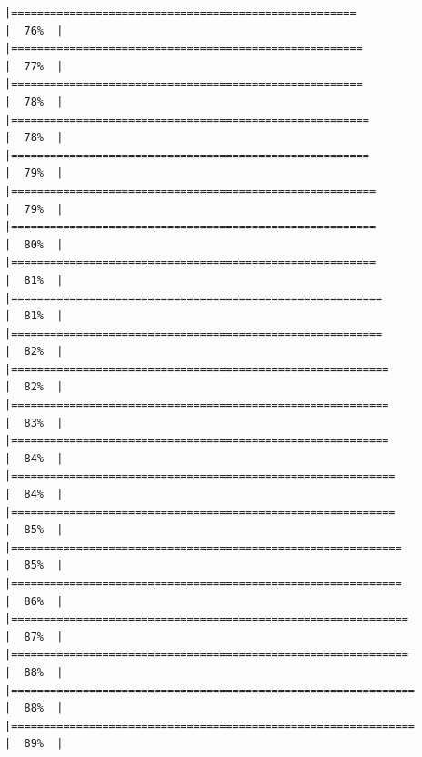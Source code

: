 \documentclass[
]{article}
\begin{document}
\begin{verbatim}
|=====================================================                 |  76%  |                                                                              |======================================================                |  77%  |                                                                              |======================================================                |  78%  |                                                                              |=======================================================               |  78%  |                                                                              |=======================================================               |  79%  |                                                                              |========================================================              |  79%  |                                                                              |========================================================              |  80%  |                                                                              |========================================================              |  81%  |                                                                              |=========================================================             |  81%  |                                                                              |=========================================================             |  82%  |                                                                              |==========================================================            |  82%  |                                                                              |==========================================================            |  83%  |                                                                              |==========================================================            |  84%  |                                                                              |===========================================================           |  84%  |                                                                              |===========================================================           |  85%  |                                                                              |============================================================          |  85%  |                                                                              |============================================================          |  86%  |                                                                              |=============================================================         |  87%  |                                                                              |=============================================================         |  88%  |                                                                              |==============================================================        |  88%  |                                                                              |==============================================================        |  89%  |                                                                              
\end{verbatim}
\end{document}
